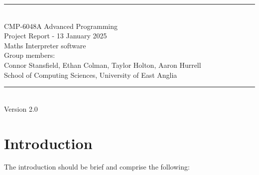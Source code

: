 \documentclass[a4paper, oneside, 11pt]{report}
\begin{document}
\begin{titlepage}
\begin{center}
\rule{12cm}{1mm} \\
\vspace{1cm}
{\large  CMP-6048A Advanced Programming} %
\vspace{7.5cm}
\\{\Large Project Report - 13 January 2025}
\vspace{1.5cm}
\\{\LARGE Maths Interpreter software} %
\vspace{1.0cm}
\\{\Large Group members: \\ Connor Stansfield, Ethan Colman, Taylor Holton, Aaron Hurrell\ }
\vspace{10.0cm}
\\{\large School of Computing Sciences, University of East Anglia}
\\ \rule{12cm}{0.5mm}
\\ \hspace{8.5cm} {\large Version 2.0}
\end{center}
\end{titlepage}


\setcounter{page}{1}


\begin{abstract}
Please replace this section with your own abstract. An abstract is a brief summary (maximum 250 words) of your entire project. It should cover your objectives, your methodologies used, a brief developmental history, your final results, in particular covering the optional tasks, and a discussion and conclusion. You do not cover the literature or background in an abstract nor should you use abbreviations or acronyms. The remainder of this report template has clear chapter titles and we suggest to stick to these although you can organise your material inside each chapter to your own preferences. A guideline in size is approximately 3,500 words (not including abstract, captions and references) but no real limit on figures, tables, diagrams, pseudo-code etc.
\end{abstract}

\chapter{Introduction}
\label{chap:intro}

The introduction should be brief and comprise the following:
\end{document}
